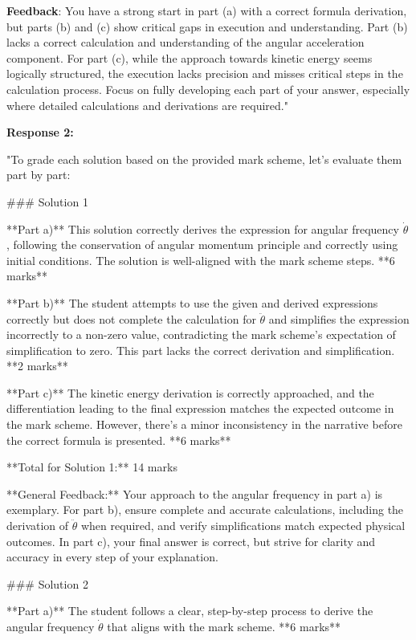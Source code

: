 \documentclass[a4paper,11pt]{article}
\begin{document}
\textbf{Feedback}: You have a strong start in part (a) with a correct formula derivation, but parts (b) and (c) show critical gaps in execution and understanding. Part (b) lacks a correct calculation and understanding of the angular acceleration component. For part (c), while the approach towards kinetic energy seems logically structured, the execution lacks precision and misses critical steps in the calculation process. Focus on fully developing each part of your answer, especially where detailed calculations and derivations are required."

\textbf{Response 2:}

"To grade each solution based on the provided mark scheme, let's evaluate them part by part:

### Solution 1

**Part a)** This solution correctly derives the expression for angular frequency \( \dot{\theta} \), following the conservation of angular momentum principle and correctly using initial conditions. The solution is well-aligned with the mark scheme steps. **6 marks**

**Part b)** The student attempts to use the given and derived expressions correctly but does not complete the calculation for \( \ddot{\theta} \) and simplifies the expression incorrectly to a non-zero value, contradicting the mark scheme's expectation of simplification to zero. This part lacks the correct derivation and simplification. **2 marks**

**Part c)** The kinetic energy derivation is correctly approached, and the differentiation leading to the final expression matches the expected outcome in the mark scheme. However, there's a minor inconsistency in the narrative before the correct formula is presented. **6 marks**

**Total for Solution 1:** 14 marks

**General Feedback:** Your approach to the angular frequency in part a) is exemplary. For part b), ensure complete and accurate calculations, including the derivation of \( \ddot{\theta} \) when required, and verify simplifications match expected physical outcomes. In part c), your final answer is correct, but strive for clarity and accuracy in every step of your explanation.

### Solution 2

**Part a)** The student follows a clear, step-by-step process to derive the angular frequency \( \dot{\theta} \) that aligns with the mark scheme. **6 marks**
\end{document}
